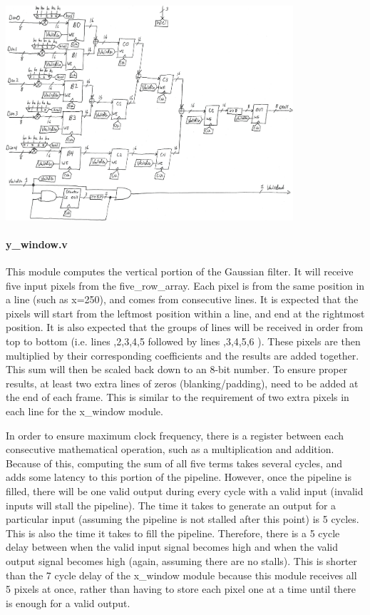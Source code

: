 \documentclass[12pt]{article}
\begin{document}
\includegraphics[width=0.8\textwidth]{processed_image_pngs/y_window.png}

\paragraph{y\_window.v} 

This module computes the vertical portion of the Gaussian filter. It 
will receive five input pixels from the five\_row\_array. Each pixel is from the 
same position in a line (such as x=250), and comes from consecutive lines. It is 
expected that the pixels will start from the leftmost position within a line, 
and end at the rightmost position. It is also expected that the groups of lines 
will be received in order from top to bottom (i.e. lines ,2,3,4,5 \rbrack followed by 
lines ,3,4,5,6 \rbrack). These pixels are then multiplied by their corresponding 
coefficients and the results are added together. This sum will then be scaled 
back down to an 8-bit number. To ensure proper results, at least two extra lines 
of zeros (blanking/padding), need to be added at the end of each frame. This is 
similar to the requirement of two extra pixels in each line for the x\_window 
module.

In order to ensure maximum clock frequency, there is a register between each 
consecutive mathematical operation, such as a multiplication and addition. 
Because of this, computing the sum of all five terms takes several cycles, and 
adds some latency to this portion of the pipeline. However, once the pipeline is 
filled, there will be one valid output during every cycle with a valid input 
(invalid inputs will stall the pipeline). The time it takes to generate an 
output for a particular input (assuming the pipeline is not stalled after this 
point) is 5 cycles. This is also the time it takes to fill the pipeline. 
Therefore, there is a 5 cycle delay between when the valid input signal becomes 
high and when the valid output signal becomes high (again, assuming there are no 
stalls). This is shorter than the 7 cycle delay of the x\_window module because 
this module receives all 5 pixels at once, rather than having to store each 
pixel one at a time until there is enough for a valid output.
\end{document}
